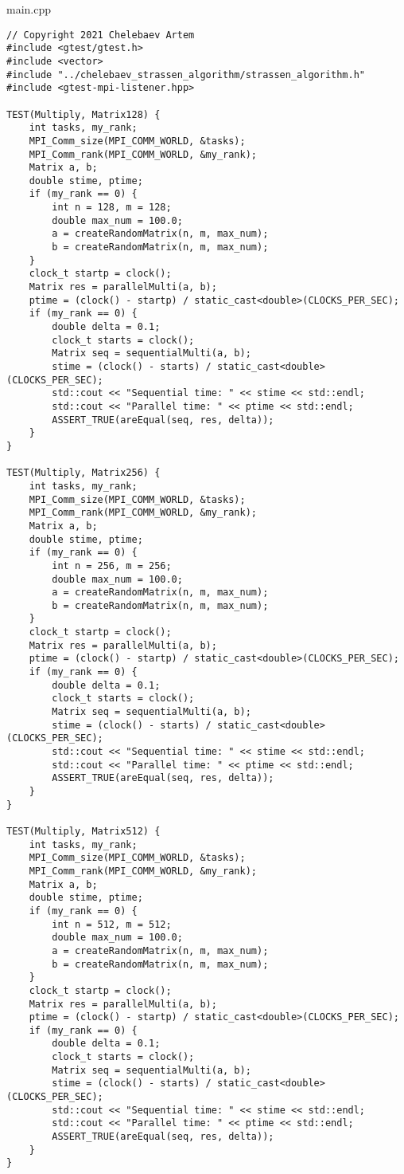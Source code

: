 \documentclass{report}
\begin{document}
main.cpp
\begin{lstlisting}
// Copyright 2021 Chelebaev Artem
#include <gtest/gtest.h>
#include <vector>
#include "../chelebaev_strassen_algorithm/strassen_algorithm.h"
#include <gtest-mpi-listener.hpp>

TEST(Multiply, Matrix128) {
    int tasks, my_rank;
    MPI_Comm_size(MPI_COMM_WORLD, &tasks);
    MPI_Comm_rank(MPI_COMM_WORLD, &my_rank);
    Matrix a, b;
    double stime, ptime;
    if (my_rank == 0) {
        int n = 128, m = 128;
        double max_num = 100.0;
        a = createRandomMatrix(n, m, max_num);
        b = createRandomMatrix(n, m, max_num);
    }
    clock_t startp = clock();
    Matrix res = parallelMulti(a, b);
    ptime = (clock() - startp) / static_cast<double>(CLOCKS_PER_SEC);
    if (my_rank == 0) {
        double delta = 0.1;
        clock_t starts = clock();
        Matrix seq = sequentialMulti(a, b);
        stime = (clock() - starts) / static_cast<double>(CLOCKS_PER_SEC);
        std::cout << "Sequential time: " << stime << std::endl;
        std::cout << "Parallel time: " << ptime << std::endl;
        ASSERT_TRUE(areEqual(seq, res, delta));
    }
}

TEST(Multiply, Matrix256) {
    int tasks, my_rank;
    MPI_Comm_size(MPI_COMM_WORLD, &tasks);
    MPI_Comm_rank(MPI_COMM_WORLD, &my_rank);
    Matrix a, b;
    double stime, ptime;
    if (my_rank == 0) {
        int n = 256, m = 256;
        double max_num = 100.0;
        a = createRandomMatrix(n, m, max_num);
        b = createRandomMatrix(n, m, max_num);
    }
    clock_t startp = clock();
    Matrix res = parallelMulti(a, b);
    ptime = (clock() - startp) / static_cast<double>(CLOCKS_PER_SEC);
    if (my_rank == 0) {
        double delta = 0.1;
        clock_t starts = clock();
        Matrix seq = sequentialMulti(a, b);
        stime = (clock() - starts) / static_cast<double>(CLOCKS_PER_SEC);
        std::cout << "Sequential time: " << stime << std::endl;
        std::cout << "Parallel time: " << ptime << std::endl;
        ASSERT_TRUE(areEqual(seq, res, delta));
    }
}

TEST(Multiply, Matrix512) {
    int tasks, my_rank;
    MPI_Comm_size(MPI_COMM_WORLD, &tasks);
    MPI_Comm_rank(MPI_COMM_WORLD, &my_rank);
    Matrix a, b;
    double stime, ptime;
    if (my_rank == 0) {
        int n = 512, m = 512;
        double max_num = 100.0;
        a = createRandomMatrix(n, m, max_num);
        b = createRandomMatrix(n, m, max_num);
    }
    clock_t startp = clock();
    Matrix res = parallelMulti(a, b);
    ptime = (clock() - startp) / static_cast<double>(CLOCKS_PER_SEC);
    if (my_rank == 0) {
        double delta = 0.1;
        clock_t starts = clock();
        Matrix seq = sequentialMulti(a, b);
        stime = (clock() - starts) / static_cast<double>(CLOCKS_PER_SEC);
        std::cout << "Sequential time: " << stime << std::endl;
        std::cout << "Parallel time: " << ptime << std::endl;
        ASSERT_TRUE(areEqual(seq, res, delta));
    }
}


\end{lstlisting}
\end{document}
